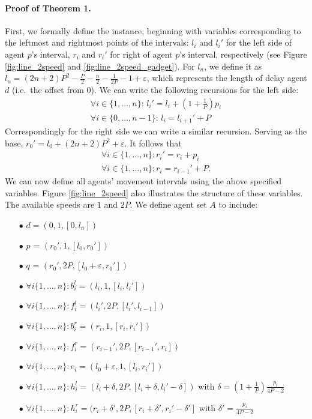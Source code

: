 \paragraph*{Proof of Theorem 1.}
\label{sec:appendixDDTL}
First, we formally define the instance, beginning with variables corresponding to the leftmost and rightmost points of the intervals: $l_i $ and $ l_i'$ for the left side of agent $p$'s interval, $r_i$ and $r_i'$ for right of agent $p$'s interval, respectively (see Figure \ref{fig:line_2speed} and \ref{fig:line_2speed_gadget}). For $l_n$, we define it as $l_n=(2n+2)P^2-\frac{P}{2}-\frac{n}{2}-\frac{1}{2P}-1 + \varepsilon$, which represents the length of delay agent $d$ (i.e.\ the offset from $0$). We can write the following recursions for the left side:
\begin{align*}
    \forall i\in\{1,...,n\}:\, l_i'=l_i+(1+\frac{1}{P})p_i \\
    \forall i\in\{0,...,n-1\}:\, l_i=l_{i+1}'+P
\end{align*}
Correspondingly for the right side we can write a similar recursion. Serving as the base, $r_0'=l_0+(2n+2)P^2+\varepsilon$. It follows that
\begin{align*}
    \forall i\in\{1,...,n\}: r_i'=r_i+p_i \\
    \forall i\in\{1,...,n\}: r_i=r_{i-1}'+P.
\end{align*}
We can now define all agents' movement intervals using the above specified variables. Figure \ref{fig:line_2speed} also illustrates the structure of these variables. The available speeds are $1$ and $2P$. We define agent set $A$  to include: 
\begin{itemize}
    \item[$\bullet$] $d=(0,1,[0,l_n])$
    \item[$\bullet$] $p$ = $(r_0',1,[l_0,r_0'])$ 
    \item[$\bullet$] $q$ = $(r_0',2P,[l_0+\varepsilon,r_0'])$
    \item[$\bullet$] $\forall i\{1,...,n\}: b_i^l=(l_i,1,[l_i,l_i'])$
    \item[$\bullet$] $\forall i\{1,...,n\}: f_i^l=(l_i',2P,[l_i',l_{i-1}])$
    \item[$\bullet$] $\forall i\{1,...,n\}: b_i^r=(r_i,1,[r_i,r_i'])$
    \item[$\bullet$] $\forall i\{1,...,n\}: f_i^r=(r_{i-1}',2P,[r_{i-1}',r_i])$
    \item[$\bullet$] $\forall i\{1,...,n\}: e_i = (l_0+\varepsilon,1,[l_i,r_i'])$
    \item[$\bullet$] $\forall i\{1,...,n\}: h_i^l=(l_i+\delta,2P,[l_i+\delta,l_i'-\delta])$ with $\delta=(1+\frac{1}{P})\frac{p_i}{4P-2}$
    \item[$\bullet$] $\forall i\{1,...,n\}: h_i^r=(r_i+\delta',2P,[r_i+\delta',r_i'-\delta']$ with $\delta'=\frac{p_i}{4P-2}$
\end{itemize}

